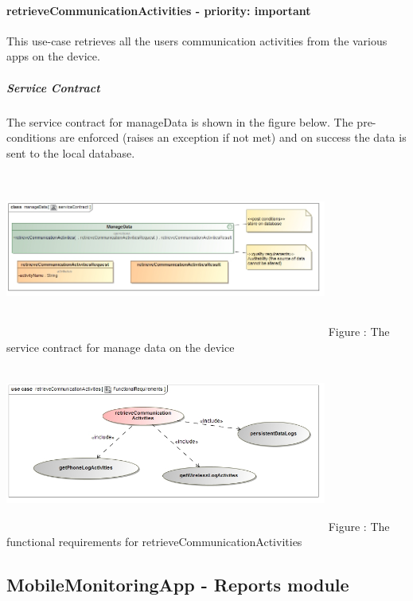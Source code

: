 \documentclass[hidelinks, 12pt, oneside]{article}
\begin{document}
	\paragraph{retrieveCommunicationActivities - priority: important}
		This use-case retrieves all the users communication activities from the various apps on the device.\newline
\subparagraph{Service Contract}
		The service contract for manageData is shown in the figure below. The pre-conditions are enforced (raises an exception if not met) and on
		success the data is sent to the local database.\newline	
	\includegraphics[width=400px,height=220px]{img/serviceContractRetrieveCommunicationActivities.jpg}
		Figure : The service contract for manage data on the device\newline
	\includegraphics[width=400px,height=220px]{img/functionalRequirementsRetrieveCommunicationActivities.jpg}
		Figure : The functional requirements for retrieveCommunicationActivities\newline
	
	
	\subsection{MobileMonitoringApp - Reports module}
\end{document}
